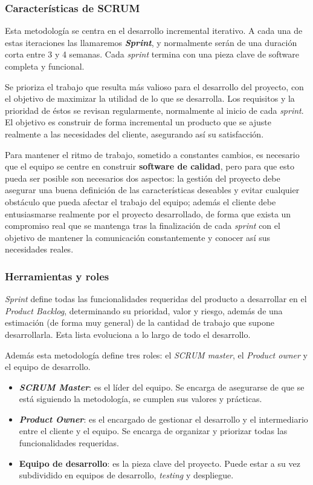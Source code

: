 \subsubsection{Características de SCRUM}
Esta metodología se centra en el desarrollo incremental iterativo. A cada una de estas iteraciones las llamaremos \textbf{\textit{Sprint}}, y normalmente serán de una duración corta entre 3 y 4 semanas. Cada \textit{sprint} termina con una pieza clave de software completa y funcional.

Se prioriza el trabajo que resulta más valioso para el desarrollo del proyecto, con el objetivo de maximizar la utilidad de lo que se desarrolla. Los requisitos y la prioridad de éstos se revisan regularmente, normalmente al inicio de cada \textit{sprint}. El objetivo es construir de forma incremental un producto que se ajuste realmente a las necesidades del cliente, asegurando así su satisfacción.

Para mantener el ritmo de trabajo, sometido a constantes cambios, es necesario que el equipo se centre en construir \textbf{software de calidad}, pero para que esto pueda ser posible son necesarios dos aspectos: la gestión del proyecto debe asegurar una buena definición de las características deseables y evitar cualquier obstáculo que pueda afectar el trabajo del equipo; además el cliente debe entusiasmarse realmente por el proyecto desarrollado, de forma que exista un compromiso real que se mantenga tras la finalización de cada \textit{sprint} con el objetivo de mantener la comunicación constantemente y conocer así sus necesidades reales.

\subsubsection{Herramientas y roles}
\textit{Sprint} define todas las funcionalidades requeridas del producto a desarrollar en el \textit{Product Backlog}, determinando su prioridad, valor y riesgo, además de una estimación (de forma muy general) de la cantidad de trabajo que supone desarrollarla. Esta lista evoluciona a lo largo de todo el desarrollo.
		
		Además esta metodología define tres roles: el \textit{SCRUM master}, el \textit{Product owner} y el equipo de desarrollo.
			\begin{itemize}
				\item \textbf{\textit{SCRUM Master}}: es el líder del equipo. Se encarga de asegurarse de que se está siguiendo la metodología, se cumplen sus valores y prácticas. 
				\item \textbf{\textit{Product Owner}}: es el encargado de gestionar el desarrollo y el intermediario entre el cliente y el equipo. Se encarga de organizar y priorizar todas las funcionalidades requeridas.
				\item \textbf{Equipo de desarrollo}: es la pieza clave del proyecto. Puede estar a su vez subdividido en equipos de desarrollo, \textit{testing} y despliegue. 
			\end{itemize}
